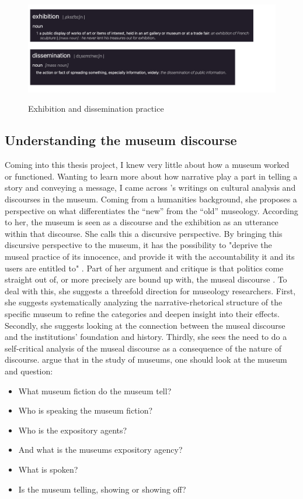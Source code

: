 \begin{figure}[H]
\centering
\includegraphics[width=14cm]{pictures/background/exh_diss.png}
\caption{Exhibition and dissemination practice}{\autocite{Oxford_dictionary}}
\end{figure}

\subsection{Understanding the museum discourse}
Coming into this thesis project, I knew very little about how a museum worked or functioned. Wanting to learn more about how narrative play a part in telling a story and conveying a message, I came across \autocite{Miekebal_book}'s writings on cultural analysis and discourses in the museum. Coming from a humanities background, she proposes a perspective on what differentiates the “new” from the “old” museology. According to her, the museum is seen as a discourse and the exhibition as an utterance within that discourse. She calls this a discursive perspective. By bringing this discursive perspective to the museum, it has the possibility to "deprive the museal practice of its innocence, and provide it with the accountability it and its users are entitled to" \autocite[p. 214]{Thi_book}. Part of her argument and critique is that politics come straight out of, or more precisely are bound up with, the museal discourse \autocite[p. 214]{Thi_book}. To deal with this, she suggests a threefold direction for museology researchers. First, she suggests systematically analyzing the narrative-rhetorical structure of the specific museum to refine the categories and deepen insight into their effects. Secondly, she suggests looking at the connection between the museal discourse and the institutions' foundation and history. Thirdly, she sees the need to do a self-critical analysis of the museal discourse as a consequence of the nature of discourse. \autocite{Miekebal_book} argue that in the study of museums, one should look at the museum and question:

\begin{itemize}
    \item What museum fiction do the museum tell? 
    \item Who is speaking the museum fiction?
    \item Who is the expository agents?
    \item And what is the museums expository agency?
    \item What is spoken? 
    \item Is the museum telling, showing or showing off?
\end{itemize}

